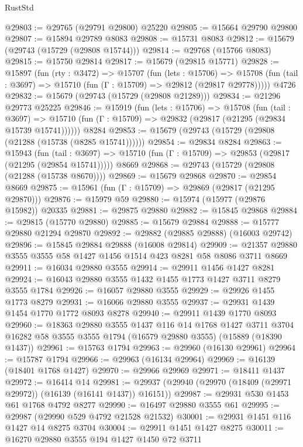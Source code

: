 \begin{lexlean}{RustStd}
\begin{coremodule}
@29803 := @29765 (@29791 @29800) @25220
@29805 := @15664 @29790 @29800
@29807 := @15894 @29789 @8083
@29808 := @15731 @8083
@29812 := @15679 (@29743 (@15729 (@29808 @15744)))
@29814 := @29768 (@15766 @8083)
@29815 := @15750 @29814
@29817 := @15679 (@29815 @15771)
@29828 := @15897
    (fun (rty : @3472) =>
    @15707
      (fun (lets : @15706) =>
      @15708 (fun (tail : @3697) => @15710 (fun (Γ : @15709) => @29812 (@29817 @29778)))))
    @4726
@29832 := @15679 (@29743 (@15729 (@29808 @21289)))
@29834 := @21296 @29773 @25225
@29846 := @15919
    (fun (lets : @15706) =>
    @15708
      (fun (tail : @3697) =>
      @15710 (fun (Γ : @15709) => @29832 (@29817 (@21295 (@29834 @15739 @15741))))))
    @8284
@29853 := @15679 (@29743 (@15729 (@29808 (@21288 (@15738 (@8285 @15741))))))
@29854 := @29834 @8284
@29863 := @15943
    (fun (tail : @3697) => @15710 (fun (Γ : @15709) => @29853 (@29817 (@21295 (@29854 @15741)))))
    @8669
@29868 := @29743 (@15729 (@29808 (@21288 (@15738 @8670))))
@29869 := @15679 @29868
@29870 := @29854 @8669
@29875 := @15961 (fun (Γ : @15709) => @29869 (@29817 (@21295 @29870)))
@29876 := @15979 @59
@29880 := @15974 (@15977 (@29876 @15982)) @20335
@29881 := @29875 @29880
@29882 := @15845 @29868
@29884 := @29815 (@15770 @29880)
@29885 := @15679 @29884
@29888 := @15777 @29880 @21294 @29870
@29892 := @29882 (@29885 @29888) (@16003 @29742)
@29896 := @15845 @29884 @29888 (@16008 @29814)
@29909 := @21357 @29880 @3555 @3555 @58 @1427 @1456 @1514 @423 @8281 @58 @8086 @3711 @8669
@29911 := @16034 @29880 @3555
@29914 := @29911 @1456 @1427 @8281
@29924 := @16043 @29880 @3555 @1432 @1455 @1773 @1427 @3711 @8279 @3555 @1784
@29926 := @16057 @29880 @3555
@29929 := @29926 @1455 @1773 @8279
@29931 := @16066 @29880 @3555
@29937 := @29931 @1439 @1454 @1770 @1772 @8093 @8278
@29940 := @29911 @1439 @1770 @8093
@29960 := @18363
    @29880
    @3555
    @1437
    @116
    @14
    @1768
    @1427
    @3711
    @3704
    @16282
    @58
    @3555
    @3555
    @1794
    (@16579 @29880 @3555)
    (@15889 (@18390 @1437))
@29961 := @15763 @1794
@29963 := @29960 (@16130 @29961)
@29964 := @15787 @1794
@29966 := @29963 (@16134 @29964)
@29969 := @16139 (@18401 @1768 @1427)
@29970 := @29966 @29969
@29971 := @18411 @1437
@29972 := @16414 @14
@29981 := @29937 (@29940 (@29970 (@18409 (@29971 @29972)) (@16139 (@16141 @1437)) @16151))
@29987 := @29931 @530 @1453 @61 @1768 @4792 @8277
@29990 := @16497 @29880 @3555 @61
@29995 := @29987 (@29990 @529 @4792 @21528 @21532)
@30001 := @29931 @1451 @116 @1427 @14 @8275 @3704
@30004 := @29911 @1451 @1427 @8275
@30011 := @16270 @29880 @3555 @194 @1427 @1450 @72 @3711

\end{coremodule}
\end{lexlean}
